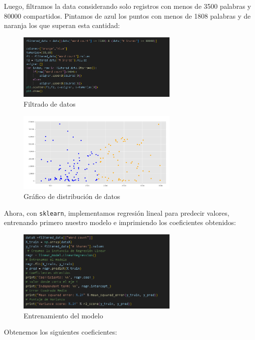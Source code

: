 \documentclass{article}
\begin{document}
Luego, filtramos la data considerando solo registros con menos de 3500 palabras y 80000 compartidos. Pintamos de azul los puntos con menos de 1808 palabras y de naranja los que superan esta cantidad:

\begin{figure}[H]
    \centering
    \includegraphics[width=0.7\textwidth]{img/6.png}
    \caption{Filtrado de datos}
\end{figure}

\begin{figure}[H]
    \centering
    \includegraphics[width=0.7\textwidth]{img/7.png}
    \caption{Gr\'afico de distribuci\'on de datos}
\end{figure}

Ahora, con \texttt{sklearn}, implementamos regresi\'on lineal para predecir valores, entrenando primero nuestro modelo e imprimiendo los coeficientes obtenidos:

\begin{figure}[H]
    \centering
    \includegraphics[width=0.7\textwidth]{img/8.png}
    \caption{Entrenamiento del modelo}
\end{figure}

Obtenemos los siguientes coeficientes:
\end{document}
